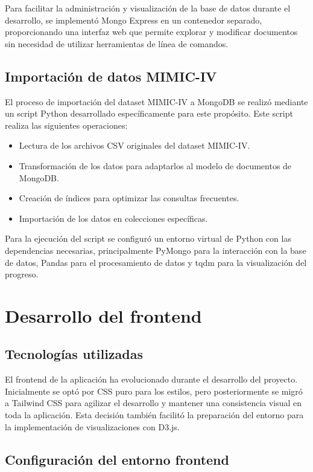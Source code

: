 Para facilitar la administración y visualización de la base de datos durante el desarrollo, se implementó Mongo Express en un contenedor separado, proporcionando una interfaz web que permite explorar y modificar documentos sin necesidad de utilizar herramientas de línea de comandos.

\subsection{Importación de datos MIMIC-IV}

El proceso de importación del dataset MIMIC-IV a MongoDB se realizó mediante un script Python desarrollado específicamente para este propósito. Este script realiza las siguientes operaciones:

\begin{itemize}
    \item Lectura de los archivos CSV originales del dataset MIMIC-IV.
    \item Transformación de los datos para adaptarlos al modelo de documentos de MongoDB.
    \item Creación de índices para optimizar las consultas frecuentes.
    \item Importación de los datos en colecciones específicas.
\end{itemize}

Para la ejecución del script se configuró un entorno virtual de Python con las dependencias necesarias, principalmente PyMongo para la interacción con la base de datos, Pandas para el procesamiento de datos y tqdm para la visualización del progreso.

\section{Desarrollo del frontend}

\subsection{Tecnologías utilizadas}

El frontend de la aplicación ha evolucionado durante el desarrollo del proyecto. Inicialmente se optó por CSS puro para los estilos, pero posteriormente se migró a Tailwind CSS para agilizar el desarrollo y mantener una consistencia visual en toda la aplicación. Esta decisión también facilitó la preparación del entorno para la implementación de visualizaciones con D3.js.

\subsection{Configuración del entorno frontend}

